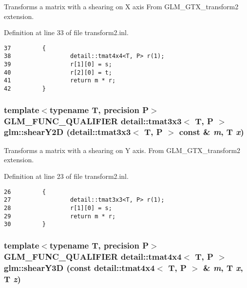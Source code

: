 Transforms a matrix with a shearing on X axis From GLM\_\-GTX\_\-transform2 extension. 

Definition at line 33 of file transform2.inl.

\begin{Code}\begin{verbatim}37         {
38                 detail::tmat4x4<T, P> r(1);
39                 r[1][0] = s;
40                 r[2][0] = t;
41                 return m * r;
42         }
\end{verbatim}
\end{Code}


\hypertarget{group__gtx__transform2_g17fa300cd87fdaadb7b40970d1efc515}{
\subsubsection[shearY2D]{\setlength{\rightskip}{0pt plus 5cm}template$<$typename T, precision P$>$ GLM\_\-FUNC\_\-QUALIFIER detail::tmat3x3$<$ T, P $>$ glm::shearY2D (detail::tmat3x3$<$ T, P $>$ const \& {\em m}, \/  T {\em x})}}
\label{group__gtx__transform2_g17fa300cd87fdaadb7b40970d1efc515}


Transforms a matrix with a shearing on Y axis. From GLM\_\-GTX\_\-transform2 extension. 

Definition at line 23 of file transform2.inl.

\begin{Code}\begin{verbatim}26         {
27                 detail::tmat3x3<T, P> r(1);
28                 r[1][0] = s;
29                 return m * r;
30         }
\end{verbatim}
\end{Code}


\hypertarget{group__gtx__transform2_g9f9bb8a5e641eb978f4ed24e980bd898}{
\subsubsection[shearY3D]{\setlength{\rightskip}{0pt plus 5cm}template$<$typename T, precision P$>$ GLM\_\-FUNC\_\-QUALIFIER detail::tmat4x4$<$ T, P $>$ glm::shearY3D (const detail::tmat4x4$<$ T, P $>$ \& {\em m}, \/  T {\em x}, \/  T {\em z})}}
\label{group__gtx__transform2_g9f9bb8a5e641eb978f4ed24e980bd898}


